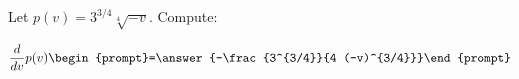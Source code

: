 \documentclass{ximera}
\author{Bart Snapp}
\begin{document}
\begin{exercise}
Let $p(v) = 3^{3/4} \sqrt[4]{-v}$. Compute:

\[
\dd{v}p(v)
\begin{prompt}=\answer{-\frac{3^{3/4}}{4 (-v)^{3/4}}}\end{prompt}
\]
\end{exercise}
\end{document}
